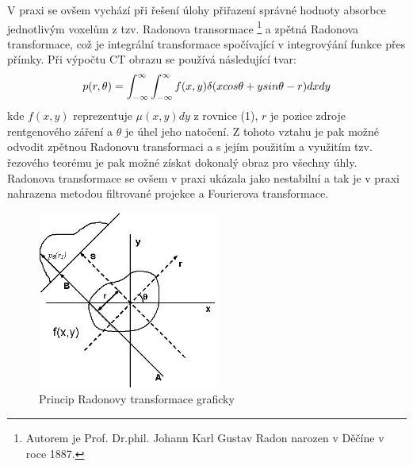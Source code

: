 \documentclass{thesis}%
\begin{document}
V praxi se ovšem vychází při řešení úlohy přiřazení správné hodnoty absorbce jednotlivým voxelům z tzv. Radonova transormace \footnote[6]{Autorem je Prof. Dr.phil. Johann Karl Gustav Radon narozen v Děčíne v roce 1887.} a zpětná Radonova transformace, což je integrální transformace spočívající v integrovýání funkce přes přímky. Při výpočtu CT obrazu se používá následující tvar:
\begin{equation}
 \centering
	p(r,\theta) = \int_{-\infty}^{\infty}\int_{-\infty}^{\infty} f(x,y) \delta(x cos\theta +y sin \theta - r)dx dy
\end{equation}
kde $f(x,y)$ reprezentuje $\mu (x,y) dy$ z rovnice (1), $r$ je pozice zdroje rentgenového záření a $\theta$ je úhel jeho natočení. Z tohoto vztahu je pak možné odvodit zpětnou Radonovu transformaci a s jejím použitím a využitím tzv. řezového teorému je pak možné získat dokonalý obraz pro všechny úhly. Radonova transformace se ovšem v praxi ukázala jako nestabilní a tak je v praxi nahrazena metodou filtrované projekce a Fourierova transformace.
\begin{figure}[ht!]
 \centering
	\includegraphics[width=6cm]{radonova_transformace.png}
	\caption[Radonova transformace]{Princip Radonovy transformace graficky}
\end{figure}
\end{document}
